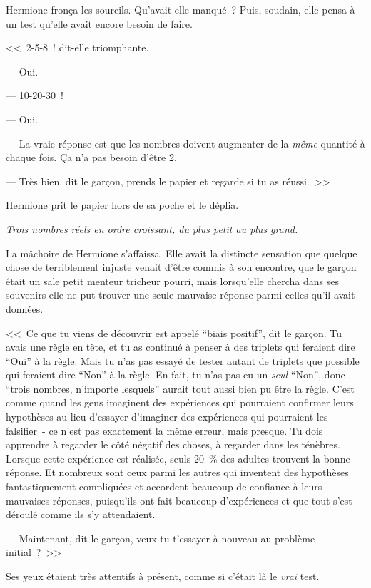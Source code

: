 Hermione fronça les sourcils. Qu'avait-elle manqué~? Puis, soudain, elle pensa à un test qu'elle avait encore besoin de faire.

<<~2-5-8~! dit-elle triomphante.

--- Oui.

--- 10-20-30~!

--- Oui.

--- La vraie réponse est que les nombres doivent augmenter de la \emph{même} quantité à chaque fois. Ça n'a pas besoin d'être 2.

--- Très bien, dit le garçon, prends le papier et regarde si tu as réussi.~>>

Hermione prit le papier hors de sa poche et le déplia.

\emph{Trois nombres réels en ordre croissant, du plus petit au plus grand.}

La mâchoire de Hermione s'affaissa. Elle avait la distincte sensation que quelque chose de terriblement injuste venait d'être commis à son encontre, que le garçon était un sale petit menteur tricheur pourri, mais lorsqu'elle chercha dans ses souvenirs elle ne put trouver une seule mauvaise réponse parmi celles qu'il avait données.

<<~Ce que tu viens de découvrir est appelé “biais positif”, dit le garçon. Tu avais une règle en tête, et tu as continué à penser à des triplets qui feraient dire “Oui” à la règle. Mais tu n'as pas essayé de tester autant de triplets que possible qui feraient dire “Non” à la règle. En fait, tu n'as pas eu un \emph{seul} “Non”, donc “trois nombres, n'importe lesquels” aurait tout aussi bien pu être la règle. C'est comme quand les gens imaginent des expériences qui pourraient confirmer leurs hypothèses au lieu d'essayer d'imaginer des expériences qui pourraient les falsifier~- ce n'est pas exactement la même erreur, mais presque. Tu dois apprendre à regarder le côté négatif des choses, à regarder dans les ténèbres. Lorsque cette expérience est réalisée, seuls 20~\% des adultes trouvent la bonne réponse. Et nombreux sont ceux parmi les autres qui inventent des hypothèses fantastiquement compliquées et accordent beaucoup de confiance à leurs mauvaises réponses, puisqu'ils ont fait beaucoup d'expériences et que tout s'est déroulé comme ils s'y attendaient.

--- Maintenant, dit le garçon, veux-tu t'essayer à nouveau au problème initial~?~>>

Ses yeux étaient très attentifs à présent, comme si c'était là le \emph{vrai} test.


